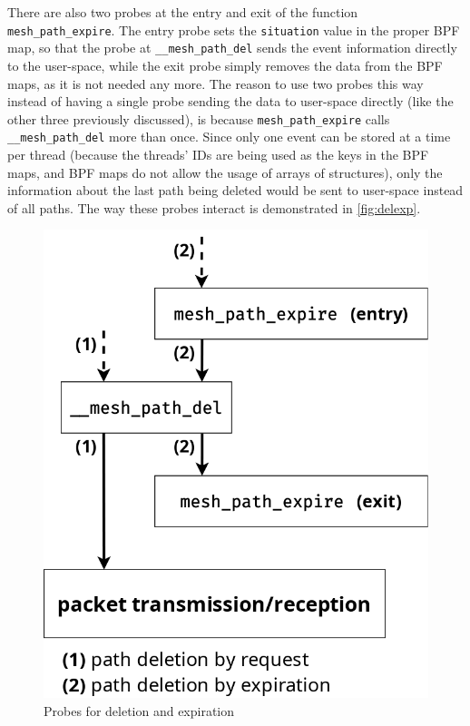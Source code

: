 There are also two probes at the entry and exit of the function
\texttt{mesh\_path\_expire}. The entry probe sets the \texttt{situation} value
in the proper BPF map, so that the probe at \texttt{\_\_mesh\_path\_del} sends
the event information directly to the user-space, while the exit probe simply
removes the data from the BPF maps, as it is not needed any more. The reason to
use two probes this way instead of having a single probe sending the data to
user-space directly (like the other three previously discussed), is because
\texttt{mesh\_path\_expire} calls \texttt{\_\_mesh\_path\_del} more than once.
Since only one event can be stored at a time per thread (because the threads'
IDs are being used as the keys in the BPF maps, and BPF maps do not allow the
usage of arrays of structures), only the information about the last path being
deleted would be sent to user-space instead of all paths. The way these probes
interact is demonstrated in \autoref{fig:delexp}.

\begin{figure}[htb]
   \centering
   \includegraphics[scale=.35]{actiondel}
   \caption{Probes for deletion and expiration}\label{fig:delexp}
\end{figure}

